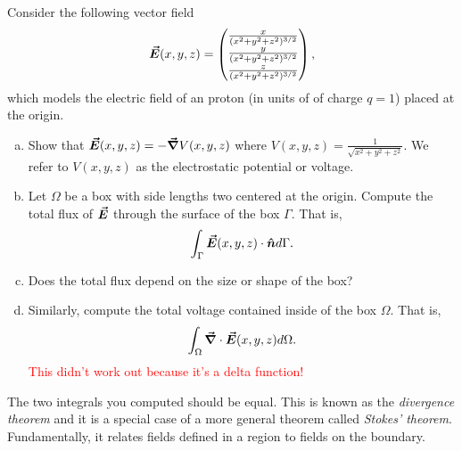 \documentclass[12pt]{article} %
\begin{document}
\begin{problem}
Consider the following vector field
\[
\boldsymbol{\vec{E}}(x,y,z) = \begin{pmatrix} \frac{x}{(x^2+y^2+z^2)^{3/2}} \\ \frac{y}{(x^2+y^2+z^2)^{3/2}} \\ \frac{z}{(x^2+y^2+z^2)^{3/2}} \end{pmatrix},
\]
which models the electric field of an proton (in units of of charge $q=1$) placed at the origin.
\begin{enumerate}[(a)]
	\item Show that $\boldsymbol{\vec{E}}(x,y,z) = - \boldsymbol{\vec{\nabla}} V(x,y,z)$ where $V(x,y,z) = \frac{1}{\sqrt{x^2+y^2+z^2}}$.  We refer to $V(x,y,z)$ as the electrostatic potential or voltage.
	\item Let $\Omega$ be a box with side lengths two centered at the origin.  Compute the total flux of $\boldsymbol{\vec{E}}$ through the surface of the box $\Gamma$. That is,
	\[
	\int_\Gamma \boldsymbol{\vec{E}}(x,y,z) \cdot \boldsymbol{\hat{n}} d\Gamma.
	\]
	\item Does the total flux depend on the size or shape of the box?
	\item Similarly, compute the total voltage contained inside of the box $\Omega$.  That is,
	\[
	\int_\Omega \boldsymbol{\vec{\nabla}} \cdot \boldsymbol{\vec{E}}(x,y,z) d\Omega.
	\]
	\textcolor{red}{This didn't work out because it's a delta function!}
\end{enumerate}
The two integrals you computed should be equal. This is known as the \emph{divergence theorem} and it is a special case of a more general theorem called \emph{Stokes' theorem}. Fundamentally, it relates fields defined in a region to fields on the boundary.
\end{problem}
\end{document}
